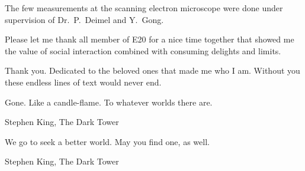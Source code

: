 	The few measurements at the scanning electron microscope were done under supervision of Dr.\ P.\ Deimel and Y.\ Gong.

	Please let me thank all member of E20 for a nice time together that showed me the value of social interaction combined with consuming delights and limits.

\begin{center}Thank you.
\newpage 
\thispagestyle{empty}
Dedicated to the beloved ones that made me who I am. Without you these endless lines of text would never end. 
\epigraph{Gone. Like a candle-flame. To whatever worlds there are.}{Stephen King, The Dark Tower}
\epigraph{We go to seek a better world. May you find one, as well.}{Stephen King, The Dark Tower}
\end{center}
\cleardoublepage{}
